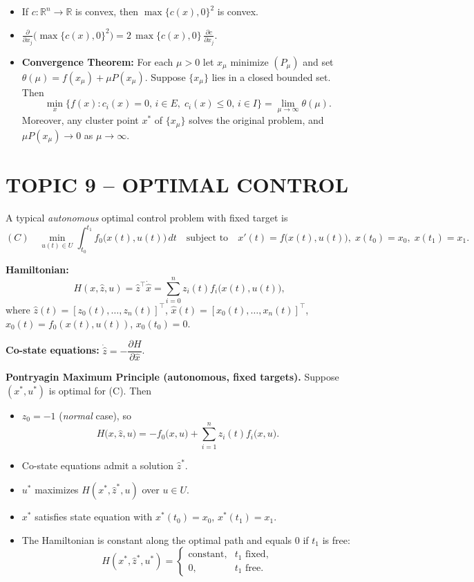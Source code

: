 \documentclass[12pt]{article}
\begin{document}
\begin{itemize}
  \item If $c: \mathbb{R}^n \to \mathbb{R}$ is convex, then $\max\{c(x),0\}^2$ is convex.
  \item $\displaystyle \frac{\partial}{\partial x_j} \bigl( \max\{c(x),0\}^2 \bigr) = 2\,\max\{c(x),0\}\, \frac{\partial c}{\partial x_j}$.
  \item \textbf{Convergence Theorem:} For each $\mu>0$ let $x_{\mu}$ minimize $(P_{\mu})$ and set $\theta(\mu)=f(x_{\mu})+\mu P(x_{\mu})$. Suppose $\{x_{\mu}\}$ lies in a closed bounded set. Then
  \[
    \min_{x} \{ f(x) : c_i(x)=0,\, i\in E,\; c_i(x)\le 0,\, i\in I \} = \lim_{\mu\to\infty} \theta(\mu).
  \]
  Moreover, any cluster point $x^*$ of $\{x_{\mu}\}$ solves the original problem, and $\mu P(x_{\mu})\to 0$ as $\mu\to\infty$.
\end{itemize}

\bigskip
\section*{TOPIC 9 -- OPTIMAL CONTROL}

A typical \emph{autonomous} optimal control problem with fixed target is
\begin{equation*}
  (C)\quad \min_{u(t)\in U} \int_{t_0}^{t_1} f_0\bigl( x(t),u(t) \bigr)\,dt
  \quad\text{subject to}\quad x' (t) = f\bigl( x(t),u(t) \bigr),\; x(t_0)=x_0,\; x(t_1)=x_1.
\end{equation*}

\textbf{Hamiltonian:}
\[
  H(x,\hat z,u) = \hat z^{\top} \dot{\hat x} = \sum_{i=0}^n z_i(t) f_i\bigl( x(t),u(t) \bigr),
\]
where $\hat z(t)=[z_0(t),\ldots,z_n(t)]^{\top}$, $\hat x(t)=[x_0(t),\ldots,x_n(t)]^{\top}$, $x_0(t)=f_0(x(t),u(t))$, $x_0(t_0)=0$.

\textbf{Co-state equations:} $\dot{\hat z} = -\dfrac{\partial H}{\partial \hat x}$.

\medskip
\textbf{Pontryagin Maximum Principle (autonomous, fixed targets).} Suppose $(x^*,u^*)$ is optimal for (C). Then
\begin{itemize}
  \item $z_0 = -1$ (\emph{normal} case), so
  \[
    H\bigl( x,\hat z,u \bigr) = -f_0\bigl( x,u \bigr) + \sum_{i=1}^n z_i(t) f_i\bigl( x,u \bigr).
  \]
  \item Co-state equations admit a solution $\hat z^*$.
  \item $u^*$ maximizes $H(x^*,\hat z^*,u)$ over $u\in U$.
  \item $x^*$ satisfies state equation with $x^*(t_0)=x_0$, $x^*(t_1)=x_1$.
  \item The Hamiltonian is constant along the optimal path and equals $0$ if $t_1$ is free:
  \[
    H(x^*,\hat z^*,u^*) = \begin{cases}
      \text{constant}, & t_1 \text{ fixed},\\
      0, & t_1 \text{ free}.
    \end{cases}
  \]
\end{itemize}
\end{document}
